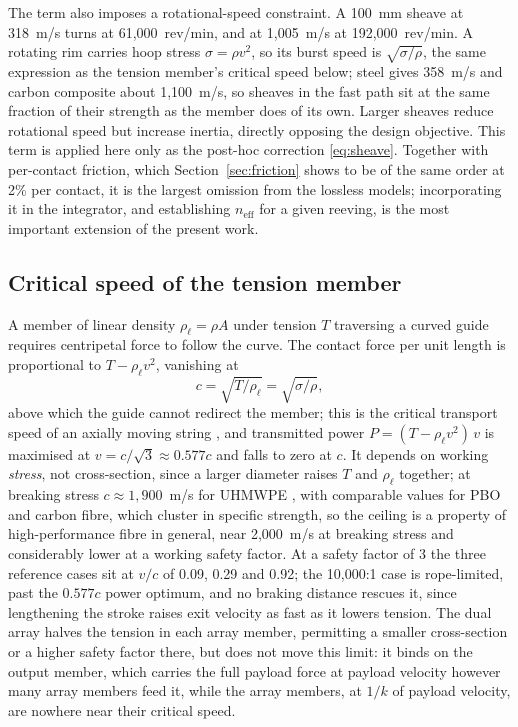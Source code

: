 \documentclass[preprint,12pt,number]{elsarticle}
\newcommand{\neff}{n_{\mathrm{eff}}}
\begin{document}
The term also imposes a rotational-speed constraint. A 100~mm sheave at 318~m/s turns at 61,000~rev/min, and at 1,005~m/s at 192,000~rev/min. A rotating rim carries hoop stress $\sigma = \rho v^2$, so its burst speed is $\sqrt{\sigma/\rho}$, the same expression as the tension member's critical speed below; steel gives 358~m/s and carbon composite about 1,100~m/s, so sheaves in the fast path sit at the same fraction of their strength as the member does of its own. Larger sheaves reduce rotational speed but increase inertia, directly opposing the design objective. This term is applied here only as the post-hoc correction \eqref{eq:sheave}. Together with per-contact friction, which Section~\ref{sec:friction} shows to be of the same order at 2\% per contact, it is the largest omission from the lossless models; incorporating it in the integrator, and establishing $\neff$ for a given reeving, is the most important extension of the present work.

\subsection{Critical speed of the tension member}
\label{sec:critical}

A member of linear density $\rho_\ell = \rho A$ under tension $T$ traversing a curved guide requires centripetal force to follow the curve. The contact force per unit length is proportional to $T - \rho_\ell v^2$, vanishing at
\begin{equation}
c = \sqrt{T/\rho_\ell} = \sqrt{\sigma/\rho},
\label{eq:critical}
\end{equation}
above which the guide cannot redirect the member; this is the critical transport speed of an axially moving string \citep{wickert1990}, and transmitted power $P = (T - \rho_\ell v^2)\,v$ is maximised at $v = c/\sqrt{3} \approx 0.577c$ and falls to zero at $c$. It depends on working \emph{stress}, not cross-section, since a larger diameter raises $T$ and $\rho_\ell$ together; at breaking stress $c \approx 1{,}900$~m/s for UHMWPE \citep{marlow}, with comparable values for PBO and carbon fibre, which cluster in specific strength, so the ceiling is a property of high-performance fibre in general, near 2,000~m/s at breaking stress and considerably lower at a working safety factor. At a safety factor of 3 the three reference cases sit at $v/c$ of 0.09, 0.29 and 0.92; the 10,000:1 case is rope-limited, past the $0.577c$ power optimum, and no braking distance rescues it, since lengthening the stroke raises exit velocity as fast as it lowers tension. The dual array halves the tension in each array member, permitting a smaller cross-section or a higher safety factor there, but does not move this limit: it binds on the output member, which carries the full payload force at payload velocity however many array members feed it, while the array members, at $1/k$ of payload velocity, are nowhere near their critical speed.
\end{document}
